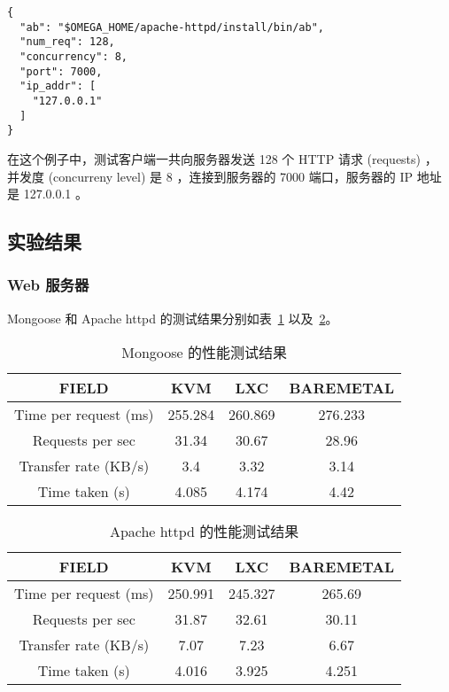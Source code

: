 \begin{lstlisting}
{
  "ab": "$OMEGA_HOME/apache-httpd/install/bin/ab",
  "num_req": 128,
  "concurrency": 8,
  "port": 7000,
  "ip_addr": [
    "127.0.0.1"
  ]
}
\end{lstlisting}

在这个例子中，测试客户端一共向服务器发送 128 个 HTTP 请求 (requests) ，
并发度 (concurreny level) 是 8 ，连接到服务器的 7000 端口，服务器的 IP 地址是
127.0.0.1 。

\subsection{实验结果}

\subsubsection{Web 服务器}

Mongoose 和 Apache httpd 的测试结果分别如表~\ref{tab:mongoose-perf}
以及~\ref{tab:apache-perf}。

\begin{table}[H]
    \centering
    \caption{Mongoose 的性能测试结果}
    \begin{tabular}{||c c c c||}
        \hline
        FIELD & KVM & LXC & BAREMETAL \\
        \hline
        \hline
        Time per request (ms) & 255.284 & 260.869 & 276.233 \\
        \hline
        Requests per sec & 31.34 & 30.67 & 28.96 \\
        \hline
        Transfer rate (KB/s) & 3.4 & 3.32 & 3.14 \\
        \hline
        Time taken (s) & 4.085 & 4.174 & 4.42 \\
        \hline
    \end{tabular}
    \label{tab:mongoose-perf}
\end{table}

\begin{table}[H]
    \centering
    \caption{Apache httpd 的性能测试结果}
    \begin{tabular}{||c c c c||}
        \hline
        FIELD & KVM & LXC & BAREMETAL \\
        \hline
        \hline
        Time per request (ms) & 250.991 & 245.327 & 265.69 \\
        \hline
        Requests per sec & 31.87 & 32.61 & 30.11 \\
        \hline
        Transfer rate (KB/s) & 7.07 & 7.23 & 6.67 \\
        \hline
        Time taken (s) & 4.016 & 3.925 & 4.251 \\
        \hline
    \end{tabular}
    \label{tab:apache-perf}
\end{table}

